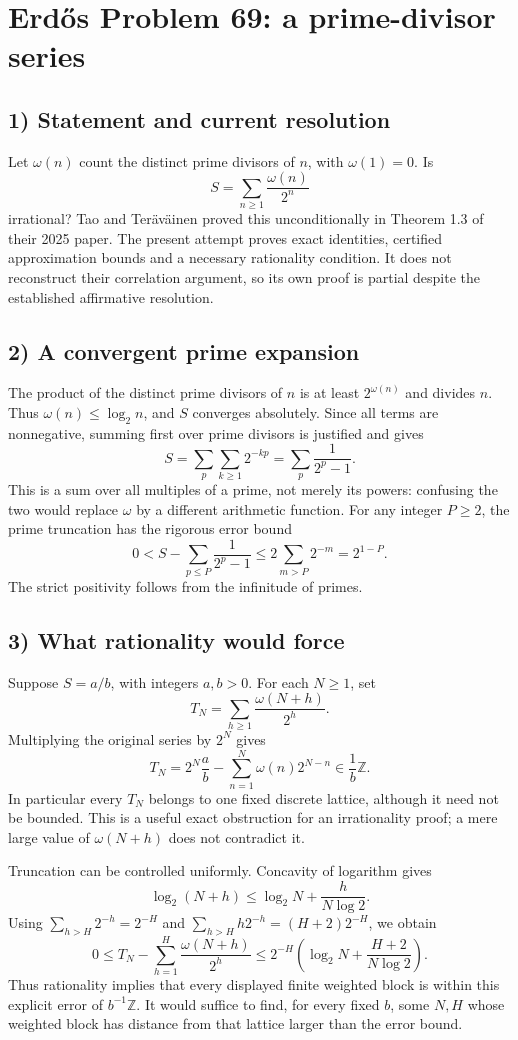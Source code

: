 \section{Erd\H{o}s Problem 69: a prime-divisor series}

\subsection{1) Statement and current resolution}
Let $\omega(n)$ count the distinct prime divisors of $n$, with
$\omega(1)=0$. Is
\[
 S=\sum_{n\geq1}\frac{\omega(n)}{2^n}
\]
irrational? Tao and Ter\"av\"ainen proved this unconditionally in
Theorem 1.3 of their 2025 paper. The present attempt proves exact
identities, certified approximation bounds and a necessary rationality
condition. It does not reconstruct their correlation argument, so its
own proof is partial despite the established affirmative resolution.

\subsection{2) A convergent prime expansion}
The product of the distinct prime divisors of $n$ is at least
$2^{\omega(n)}$ and divides $n$. Thus $\omega(n)\leq\log_2 n$,
and $S$ converges absolutely. Since all terms are nonnegative, summing
first over prime divisors is justified and gives
\[
 S=\sum_p\sum_{k\geq1}2^{-kp}
  =\sum_p\frac1{2^p-1}.
\]
This is a sum over all multiples of a prime, not merely its powers:
confusing the two would replace $\omega$ by a different arithmetic
function. For any integer $P\geq2$, the prime truncation has the
rigorous error bound
\[
 0<S-\sum_{p\leq P}\frac1{2^p-1}
 \leq 2\sum_{m>P}2^{-m}=2^{1-P}.
\]
The strict positivity follows from the infinitude of primes.

\subsection{3) What rationality would force}
Suppose $S=a/b$, with integers $a,b>0$. For each $N\geq1$, set
\[
 T_N=\sum_{h\geq1}\frac{\omega(N+h)}{2^h}.
\]
Multiplying the original series by $2^N$ gives
\[
 T_N=2^N\frac ab-\sum_{n=1}^N\omega(n)2^{N-n}
       \in \frac1b\mathbb Z.
\]
In particular every $T_N$ belongs to one fixed discrete lattice,
although it need not be bounded. This is a useful exact obstruction
for an irrationality proof; a mere large value of $\omega(N+h)$ does
not contradict it.

Truncation can be controlled uniformly. Concavity of logarithm gives
\[
 \log_2(N+h)\leq\log_2 N+\frac{h}{N\log 2}.
\]
Using $\sum_{h>H}2^{-h}=2^{-H}$ and
$\sum_{h>H}h2^{-h}=(H+2)2^{-H}$, we obtain
\[
 0\leq T_N-\sum_{h=1}^H\frac{\omega(N+h)}{2^h}
 \leq 2^{-H}\left(\log_2N+\frac{H+2}{N\log2}\right).
\]
Thus rationality implies that every displayed finite weighted block
is within this explicit error of $b^{-1}\mathbb Z$. It would suffice
to find, for every fixed $b$, some $N,H$ whose weighted block has
distance from that lattice larger than the error bound.

